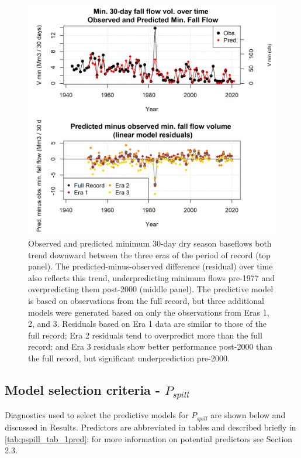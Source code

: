 \documentclass[hess, manuscript]{copernicus}
\begin{document}
\begin{figure}
\includegraphics[width=1\linewidth]{f13} \caption{\label{fig:v_min_over_time} Observed and predicted minimum 30-day dry season baseflows both trend downward between the three eras of the period of record (top panel). The predicted-minus-observed difference (residual) over time also reflects this trend, underpredicting minimum flows pre-1977 and overpredicting them post-2000 (middle panel). The predictive model is based on observations from the full record, but three additional models were generated based on only the observations from Eras 1, 2, and 3. Residuals based on Era 1 data are similar to those of the full record; Era 2 residuals tend to overpredict more than the full record; and Era 3 residuals show better performance post-2000 than the full record, but significant underprediction pre-2000.}\label{fig:v_min_over_time}
\end{figure}

\newpage

\subsection{\texorpdfstring{Model selection criteria -
\(P_{spill}\)}{Model selection criteria - P\_\{spill\}}}

Diagnostics used to select the predictive models for \(P_{spill}\) are
shown below and discussed in Results. Predictors are abbreviated in
tables and described briefly in \autoref{tab:pspill_tab_1pred}; for more
information on potential predictors see Section 2.3.
\end{document}
